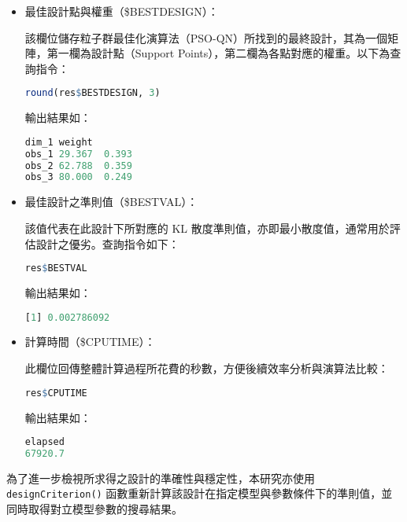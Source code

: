 \begin{itemize}
\item 最佳設計點與權重（\$BESTDESIGN）：

該欄位儲存粒子群最佳化演算法（PSO-QN）所找到的最終設計，其為一個矩陣，第一欄為設計點（Support Points），第二欄為各點對應的權重。以下為查詢指令：

\begin{lstlisting}[language=R, caption={最佳設計點與對應權重}]
round(res$BESTDESIGN, 3)
\end{lstlisting}

輸出結果如：

\begin{lstlisting}[language=R, caption={最佳設計點與對應權重的結果}]
       dim_1 weight
obs_1 29.367  0.393
obs_2 62.788  0.359
obs_3 80.000  0.249
\end{lstlisting}

\item 最佳設計之準則值（\$BESTVAL）：

該值代表在此設計下所對應的 KL 散度準則值，亦即最小散度值，通常用於評估設計之優劣。查詢指令如下：

\begin{lstlisting}[language=R, caption={最佳設計之 KL 散度標準值}]
res$BESTVAL
\end{lstlisting}

輸出結果如：

\begin{lstlisting}[language=R, caption={最佳設計之 KL 散度標準值的結果}]
[1] 0.002786092
\end{lstlisting}

\item 計算時間（\$CPUTIME）：

此欄位回傳整體計算過程所花費的秒數，方便後續效率分析與演算法比較：

\begin{lstlisting}[language=R, caption={演算法總運行時間}]
res$CPUTIME
\end{lstlisting}

輸出結果如：

\begin{lstlisting}[language=R, caption={演算法總運行時間的結果}]
elapsed
67920.7 
\end{lstlisting}

\end{itemize}

為了進一步檢視所求得之設計的準確性與穩定性，本研究亦使用 \verb|designCriterion()| 函數重新計算該設計在指定模型與參數條件下的準則值，並同時取得對立模型參數的搜尋結果。


